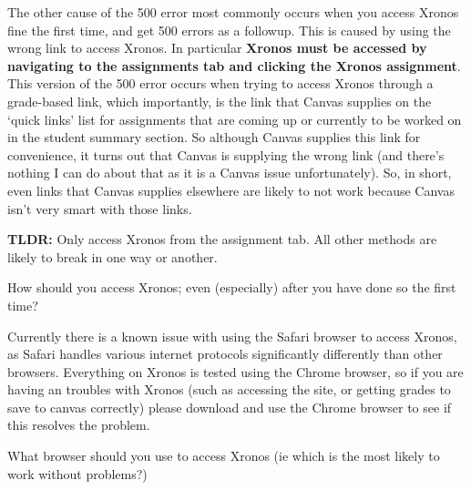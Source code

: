 \documentclass{ximera}
\begin{document}
The other cause of the 500 error most commonly occurs when you access Xronos fine the first time, and get 500 errors as a followup. This is caused by using the wrong link to access Xronos. In particular \textbf{Xronos must be accessed by navigating to the assignments tab and clicking the Xronos assignment}. This version of the 500 error occurs when trying to access Xronos through a grade-based link, which importantly, is the link that Canvas supplies on the `quick links' list for assignments that are coming up or currently to be worked on in the student summary section. So although Canvas supplies this link for convenience, it turns out that Canvas is supplying the wrong link (and there's nothing I can do about that as it is a Canvas issue unfortunately). So, in short, even links that Canvas supplies elsewhere are likely to not work because Canvas isn't very smart with those links.

\textbf{TLDR:} Only access Xronos from the assignment tab. All other methods are likely to break in one way or another.

\begin{problem}
    How should you access Xronos; even (especially) after you have done so the first time?
    \begin{selectAll}
    \end{selectAll}
\end{problem}


Currently there is a known issue with using the Safari browser to access Xronos, as Safari handles various internet protocols significantly differently than other browsers. Everything on Xronos is tested using the Chrome browser, so if you are having an troubles with Xronos (such as accessing the site, or getting grades to save to canvas correctly) please download and use the Chrome browser to see if this resolves the problem.

\begin{problem}
    What browser should you use to access Xronos (ie which is the most likely to work without problems?)
    \begin{multipleChoice}
    \end{multipleChoice}
\end{problem}
\end{document}
